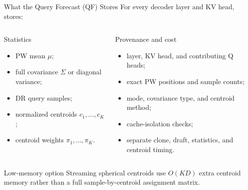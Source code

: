 \documentclass[aspectratio=169,10pt]{beamer}
\newcommand{\code}[1]{\texttt{\detokenize{#1}}}
\newcommand{\tightitems}{\setlength{\itemsep}{0.28em}\setlength{\parskip}{0pt}}
\begin{document}
\begin{frame}{What the Query Forecast (QF) Stores}
\scriptsize
For every decoder layer and KV head, \code{QueryForecast} stores:
\begin{columns}[T,onlytextwidth]
\begin{block}{Statistics}
\begin{itemize}\tightitems
  \item PW mean $\mu$;
  \item full covariance $\Sigma$ or diagonal variance;
  \item DR query samples;
  \item normalized centroids $c_1,\dots,c_K$;
  \item centroid weights $\pi_1,\dots,\pi_K$.
\end{itemize}
\end{block}
\begin{block}{Provenance and cost}
\begin{itemize}\tightitems
  \item layer, KV head, and contributing Q heads;
  \item exact PW positions and sample counts;
  \item mode, covariance type, and centroid method;
  \item cache-isolation checks;
  \item separate clone, draft, statistics, and centroid timing.
\end{itemize}
\end{block}
\end{columns}
\begin{alertblock}{Low-memory option}
Streaming spherical centroids use $O(KD)$ extra centroid memory rather than a full sample-by-centroid
assignment matrix.
\end{alertblock}
\end{frame}
\end{document}
